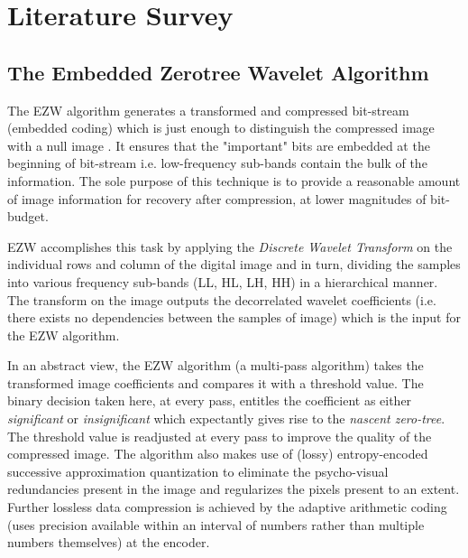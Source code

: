 \documentclass[./A14_Report.tex]{subfiles}
\begin{document}
\chapter{Literature Survey}

\section{The Embedded Zerotree Wavelet Algorithm}%
\label{sec:the_embedded_zerotree_wavelet_algorithm}

The EZW algorithm generates a transformed and compressed bit-stream (embedded
coding) which is just enough to distinguish the compressed image with a null
image \cite{shap1993}. It ensures that the "important" bits are embedded at the
beginning of bit-stream i.e. low-frequency sub-bands contain the bulk of the
information. The sole purpose of this technique is to provide a reasonable
amount of image information for recovery after compression, at lower magnitudes
of bit-budget.

\par

EZW accomplishes this task by applying the \textit{Discrete Wavelet Transform}
on the individual rows and column of the digital image and in turn, dividing
the samples into various frequency sub-bands (LL, HL, LH, HH) in a hierarchical
manner. The transform on the image outputs the decorrelated wavelet
coefficients (i.e. there exists no dependencies between the samples of image)
which is the input for the EZW algorithm.

\par

In an abstract view, the EZW algorithm (a multi-pass algorithm) takes the
transformed image coefficients and compares it with a threshold value. The
binary decision taken here, at every pass, entitles the coefficient as either
\textit{significant} or \textit{insignificant} which expectantly gives rise to
the \textit{nascent zero-tree}. The threshold value is readjusted at every pass
to improve the quality of the compressed image. The algorithm also makes use of
(lossy) entropy-encoded successive approximation quantization to eliminate the
psycho-visual redundancies present in the image and regularizes the pixels
present to an extent. Further lossless data compression is achieved by the
adaptive arithmetic coding (uses precision available within an interval of
numbers rather than multiple numbers themselves) at the encoder.

\par
\end{document}
